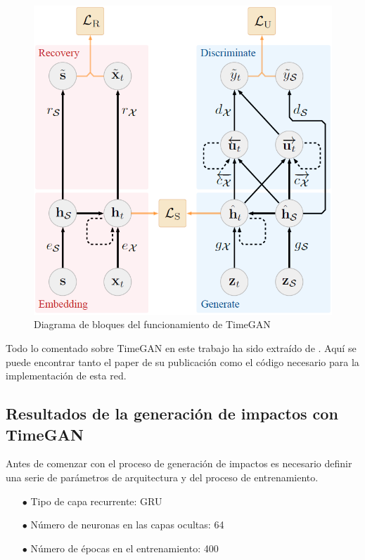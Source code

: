 \begin{figure}[h!]
    \centering
    \includegraphics[width=125mm, angle=0]{4/Fotos/TimeGAN.png}
    \captionsetup{justification=centering,margin=1.25cm}
    \caption{Diagrama de bloques del funcionamiento de TimeGAN}
    \label{fig:TimeGAN}
\end{figure}

Todo lo comentado sobre TimeGAN en este trabajo ha sido extraído de \cite{TimeGAN}. Aquí se puede encontrar tanto el paper de su publicación como el código necesario para la implementación de esta red.




\subsection{Resultados de la generación de impactos con TimeGAN}

Antes de comenzar con el proceso de generación de impactos es necesario definir una serie de parámetros de arquitectura y del proceso de entrenamiento.

\begin{itemize}
    \item[$\bullet$] Tipo de capa recurrente: GRU
    \item[$\bullet$] Número de neuronas en las capas ocultas: 64
    \item[$\bullet$] Número de épocas en el entrenamiento: 400
\end{itemize}

